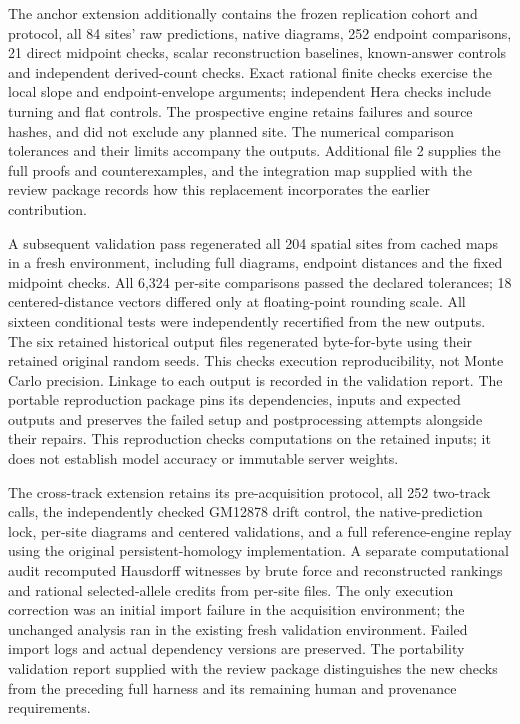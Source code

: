 \documentclass[
  11pt,
]{article}
\begin{document}
The anchor extension additionally contains the frozen replication cohort
and protocol, all 84 sites' raw predictions, native diagrams, 252
endpoint comparisons, 21 direct midpoint checks, scalar reconstruction
baselines, known-answer controls and independent derived-count checks.
Exact rational finite checks exercise the local slope and
endpoint-envelope arguments; independent Hera checks include turning and
flat controls. The prospective engine retains failures and source
hashes, and did not exclude any planned site. The numerical comparison
tolerances and their limits accompany the outputs. Additional file 2
supplies the full proofs and counterexamples, and the integration map
supplied with the review package records how this replacement
incorporates the earlier contribution.

A subsequent validation pass regenerated all 204 spatial sites from
cached maps in a fresh environment, including full diagrams, endpoint
distances and the fixed midpoint checks. All 6,324 per-site comparisons
passed the declared tolerances; 18 centered-distance vectors differed
only at floating-point rounding scale. All sixteen conditional tests
were independently recertified from the new outputs. The six retained
historical output files regenerated byte-for-byte using their retained
original random seeds. This checks execution reproducibility, not Monte
Carlo precision. Linkage to each output is recorded in the validation
report. The portable reproduction package pins its dependencies, inputs
and expected outputs and preserves the failed setup and postprocessing
attempts alongside their repairs. This reproduction checks computations
on the retained inputs; it does not establish model accuracy or
immutable server weights.

The cross-track extension retains its pre-acquisition protocol, all 252
two-track calls, the independently checked GM12878 drift control, the
native-prediction lock, per-site diagrams and centered validations, and
a full reference-engine replay using the original persistent-homology
implementation. A separate computational audit recomputed Hausdorff
witnesses by brute force and reconstructed rankings and rational
selected-allele credits from per-site files. The only execution
correction was an initial import failure in the acquisition environment;
the unchanged analysis ran in the existing fresh validation environment.
Failed import logs and actual dependency versions are preserved. The
portability validation report supplied with the review package
distinguishes the new checks from the preceding full harness and its
remaining human and provenance requirements.
\end{document}
